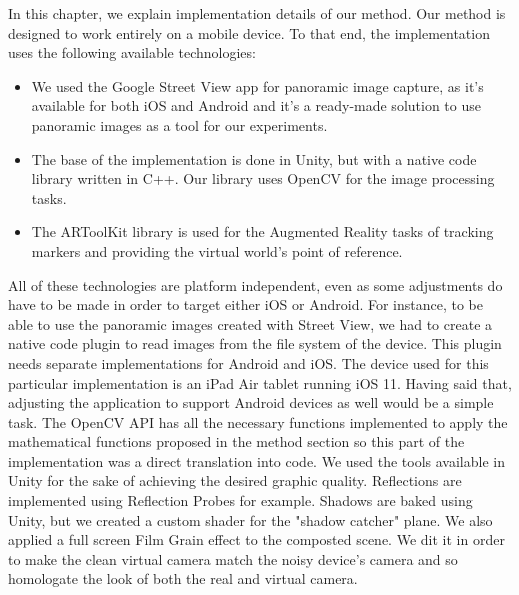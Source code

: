 
In this chapter, we explain implementation details of our method.
Our method is designed to work entirely on a mobile device. To that end, the implementation uses the following available technologies: 

\begin{itemize}
    \item We used the Google Street View app for panoramic image capture, as it's available for both iOS and Android and it's a ready-made solution to use panoramic images as a tool for our experiments.
    \item The base of the implementation is done in Unity, but with a native code library written in C++. Our library uses OpenCV for the image processing tasks.
    \item The ARToolKit library is used for the Augmented Reality tasks of tracking markers and providing the virtual world's point of reference.
\end{itemize}

All of these technologies are platform independent, even as some adjustments do have to be made in order to target either iOS or Android. For instance, to be able to use the panoramic images created with Street View, we had to create a native code plugin to read images from the file system of the device. This plugin needs separate implementations for Android and iOS. \newline
The device used for this particular implementation is an iPad Air tablet running iOS 11. Having said that, adjusting the application to support Android devices as well would be a simple task.\newline
The OpenCV API has all the necessary functions implemented to apply the mathematical functions proposed in the method section so this part of the implementation was a direct translation into code. We used the tools available in Unity for the sake of achieving the desired graphic quality. Reflections are implemented using Reflection Probes for example. Shadows are baked using Unity, but we created a custom shader for the "shadow catcher" plane. We also applied a full screen Film Grain effect to the composted scene. We dit it in order to make the clean virtual camera match the noisy device's camera and so homologate the look of both the real and virtual camera.